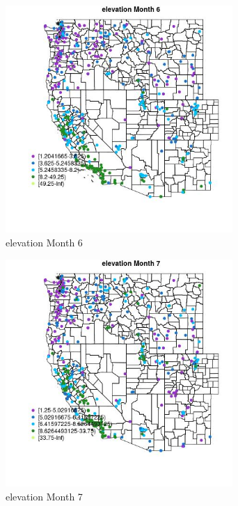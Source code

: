 \begin{figure} 
\centering  
\includegraphics[width=0.77\textwidth]{Code_Outputs/ML_input_report_ML_input_PM25_Step5_part_d_de_duplicated_aves_ML_input_MapObsMo6elevation.jpg} 
\caption{\label{fig:ML_input_report_ML_input_PM25_Step5_part_d_de_duplicated_aves_ML_inputMapObsMo6elevation}elevation Month 6} 
\end{figure} 
 

\begin{figure} 
\centering  
\includegraphics[width=0.77\textwidth]{Code_Outputs/ML_input_report_ML_input_PM25_Step5_part_d_de_duplicated_aves_ML_input_MapObsMo7elevation.jpg} 
\caption{\label{fig:ML_input_report_ML_input_PM25_Step5_part_d_de_duplicated_aves_ML_inputMapObsMo7elevation}elevation Month 7} 
\end{figure} 
 


